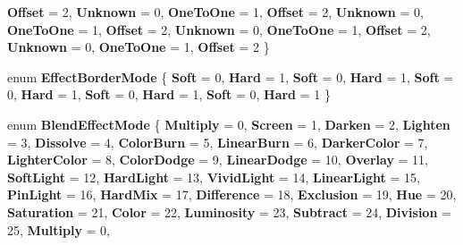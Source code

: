\begin{DoxyCompactItemize}
{\bfseries Offset} = 2, 
{\bfseries Unknown} = 0, 
\newline
{\bfseries One\+To\+One} = 1, 
{\bfseries Offset} = 2, 
{\bfseries Unknown} = 0, 
{\bfseries One\+To\+One} = 1, 
\newline
{\bfseries Offset} = 2, 
{\bfseries Unknown} = 0, 
{\bfseries One\+To\+One} = 1, 
{\bfseries Offset} = 2, 
\newline
{\bfseries Unknown} = 0, 
{\bfseries One\+To\+One} = 1, 
{\bfseries Offset} = 2
 \}
\item 
\mbox{\label{namespace_microsoft_1_1_graphics_1_1_canvas_1_1_effects_af071f1b230fa4fc760f6db8e5ad7d9db}} 
enum {\bfseries Effect\+Border\+Mode} \{ \newline
{\bfseries Soft} = 0, 
{\bfseries Hard} = 1, 
{\bfseries Soft} = 0, 
{\bfseries Hard} = 1, 
\newline
{\bfseries Soft} = 0, 
{\bfseries Hard} = 1, 
{\bfseries Soft} = 0, 
{\bfseries Hard} = 1, 
\newline
{\bfseries Soft} = 0, 
{\bfseries Hard} = 1
 \}
\item 
\mbox{\label{namespace_microsoft_1_1_graphics_1_1_canvas_1_1_effects_a2cba8d6181059b5f496c6734b739752e}} 
enum {\bfseries Blend\+Effect\+Mode} \{ \newline
{\bfseries Multiply} = 0, 
{\bfseries Screen} = 1, 
{\bfseries Darken} = 2, 
{\bfseries Lighten} = 3, 
\newline
{\bfseries Dissolve} = 4, 
{\bfseries Color\+Burn} = 5, 
{\bfseries Linear\+Burn} = 6, 
{\bfseries Darker\+Color} = 7, 
\newline
{\bfseries Lighter\+Color} = 8, 
{\bfseries Color\+Dodge} = 9, 
{\bfseries Linear\+Dodge} = 10, 
{\bfseries Overlay} = 11, 
\newline
{\bfseries Soft\+Light} = 12, 
{\bfseries Hard\+Light} = 13, 
{\bfseries Vivid\+Light} = 14, 
{\bfseries Linear\+Light} = 15, 
\newline
{\bfseries Pin\+Light} = 16, 
{\bfseries Hard\+Mix} = 17, 
{\bfseries Difference} = 18, 
{\bfseries Exclusion} = 19, 
\newline
{\bfseries Hue} = 20, 
{\bfseries Saturation} = 21, 
{\bfseries Color} = 22, 
{\bfseries Luminosity} = 23, 
\newline
{\bfseries Subtract} = 24, 
{\bfseries Division} = 25, 
{\bfseries Multiply} = 0, 

\end{DoxyCompactItemize}
